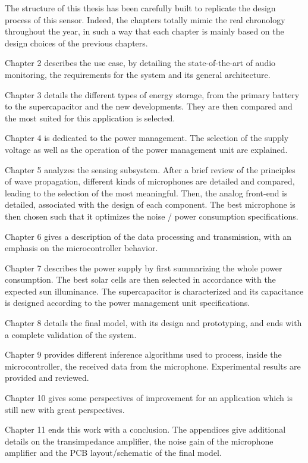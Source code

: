 \documentclass{EPL-master-thesis-covers-EN}
\begin{document}
The structure of this thesis has been carefully built to replicate the design process of this sensor. Indeed, the chapters totally mimic the real chronology throughout the year, in such a way that each chapter is mainly based on the design choices of the previous chapters. 

Chapter 2 describes the use case, by detailing the state-of-the-art of audio monitoring, the requirements for the system and its general architecture.

Chapter 3 details the different types of energy storage, from the primary battery to the supercapacitor and the new developments. They are then compared and the most suited for this application is selected.  

Chapter 4 is dedicated to the power management. The selection of the supply voltage as well as the operation of the power management unit are explained.

Chapter 5 analyzes the sensing subsystem. After a brief review of the principles of wave propagation, different kinds of microphones are detailed and compared, leading to the selection of the most meaningful. Then, the analog front-end is detailed, associated with the design of each component. The best microphone is then chosen such that it optimizes the noise / power consumption specifications.

Chapter 6 gives a description of the data processing and transmission, with an emphasis on the microcontroller behavior.

Chapter 7 describes the power supply by first summarizing the whole power consumption. The best solar cells are then selected in accordance with the expected sun illuminance. The supercapacitor is characterized and its capacitance is designed according to the power management unit specifications.

Chapter 8 details the final model, with its design and prototyping, and ends with a complete validation of the system.

Chapter 9 provides different inference algorithms used to process, inside the microcontroller, the received data from the microphone. Experimental results are provided and reviewed.

Chapter 10 gives some perspectives of improvement for an application which is still new with great perspectives.

Chapter 11 ends this work with a conclusion. The appendices give additional details on the transimpedance amplifier, the noise gain of the microphone amplifier and the PCB layout/schematic of the final model.
\end{document}
